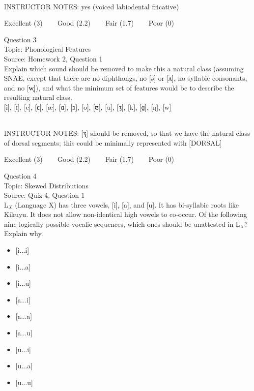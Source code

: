 \documentclass[12pt]{article}
\begin{document}
~\\
INSTRUCTOR NOTES: yes (voiced labiodental fricative)


\vfill
Excellent (3) ~~~ Good (2.2) ~~~ Fair (1.7) ~~~ Poor (0)
\newpage

{\large Question 3}\\

Topic: Phonological Features\\
Source: Homework 2, Question 1\\

Explain which sound should be removed to make this a natural class (assuming SNAE, except that there are no diphthongs, no [ə] or [ʌ], no syllabic consonants, and no [w̥]), and what the minimum set of features would be to describe the resulting natural class.\\

{[i]}, {[ɪ]}, {[e]}, {[ɛ]}, {[æ]}, {[ɑ]}, {[ɔ]}, {[o]}, {[ʊ]}, {[u]}, {[ʒ]}, {[k]}, {[ɡ]}, {[ŋ]}, {[w]}


~\\
INSTRUCTOR NOTES: [ʒ] should be removed, so that we have the natural class of dorsal segments; this could be minimally represented with [DORSAL]


\vfill
Excellent (3) ~~~ Good (2.2) ~~~ Fair (1.7) ~~~ Poor (0)
\newpage

{\large Question 4}\\

Topic: Skewed Distributions\\
Source: Quiz 4, Question 1\\

L$_X$ (Language X) has three vowels, [i], [a], and [u]. It has bi-syllabic roots like Kikuyu. It does not allow non-identical high vowels to co-occur. Of the following nine logically possible vocalic sequences, which ones should be unattested in L$_X$? Explain why.\\

\begin{itemize} \item {[i...i]} \item {[i...a]} \item {[i...u]} \item {[a...i]} \item {[a...a]} \item {[a...u]} \item {[u...i]} \item {[u...a]} \item {[u...u]} \end{itemize}
\end{document}
